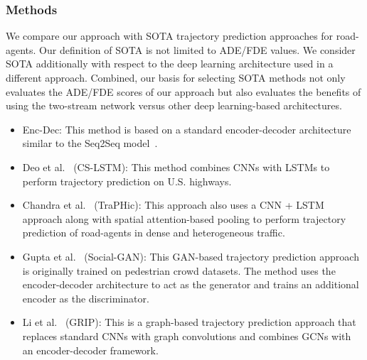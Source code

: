 \documentclass[10pt,twocolumn,letterpaper]{article}
\theoremstyle{plain}
\begin{document}
\subsubsection{Methods} 

We compare our approach with SOTA trajectory prediction approaches for road-agents. Our definition of SOTA is not limited to ADE/FDE values. We consider SOTA additionally with respect to the deep learning architecture used in a different approach.
Combined, our basis for selecting SOTA methods not only evaluates the ADE/FDE scores of our approach but also evaluates the benefits of using the two-stream network versus other deep learning-based architectures.

\begin{itemize}[noitemsep]
    \item Enc-Dec: This method is based on a standard encoder-decoder architecture similar to the Seq2Seq model~\cite{rnn1}.
    \item Deo et al.~\cite{nachiket} (CS-LSTM): This method combines CNNs with LSTMs to perform trajectory prediction on U.S. highways.
    \item Chandra et al.~\cite{traphic} (TraPHic): This approach also uses a CNN + LSTM approach along with spatial attention-based pooling to perform trajectory prediction of road-agents in dense and heterogeneous traffic.
    \item Gupta et al.~\cite{social-gan} (Social-GAN): This GAN-based trajectory prediction approach is originally trained on pedestrian crowd datasets. The method uses the encoder-decoder architecture to act as the generator and trains an additional encoder as the discriminator.   
    \item Li et al.~\cite{li2019grip} (GRIP): This is a graph-based trajectory prediction approach that replaces standard CNNs with graph convolutions and combines GCNs with an encoder-decoder framework. 
\end{itemize}
\end{document}
